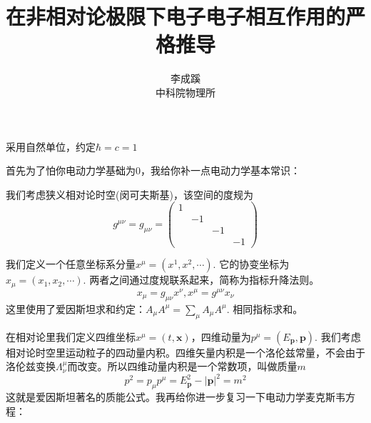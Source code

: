 \documentclass[a4paper]{article}
\begin{document}
    \title{在非相对论极限下电子电子相互作用的严格推导}
    \author{李成蹊\\中科院物理所}
    \date{}
    \maketitle

    采用自然单位，约定$\hbar=c=1$

    首先为了怕你电动力学基础为$0$，我给你补一点电动力学基本常识：

    我们考虑狭义相对论时空(闵可夫斯基)，该空间的度规为
    \begin{equation}
        g^{\mu\nu}=g_{\mu\nu}=\begin{pmatrix}
            1\\
            &-1\\
            &&-1\\
            &&&-1
        \end{pmatrix}
    \end{equation}
    
    我们定义一个任意坐标系分量$x^\mu=(x^1,x^2,\cdots)$. 它的协变坐标为$x_\mu=(x_1,x_2,\cdots)$. 两者之间通过度规联系起来，简称为指标升降法则。
    \begin{equation}
        x_{\mu}=g_{\mu\nu}x^{\nu},x^{\mu}=g^{\mu\nu}x_{\nu}
    \end{equation}
    这里使用了爱因斯坦求和约定：$A_\mu A^\mu=\sum_{\mu}A_\mu A^\mu$. 相同指标求和。
    
    在相对论里我们定义四维坐标$x^\mu=(t,\mathbf{x})$，四维动量为$p^\mu=(E_\mathbf{p},\mathbf{p})$. 我们考虑相对论时空里运动粒子的四动量内积。四维矢量内积是一个洛伦兹常量，不会由于洛伦兹变换$\Lambda^\mu_\nu$而改变。所以四维动量内积是一个常数项，叫做质量$m$
    \begin{equation}
        p^2=p_\mu p^\mu=E_\mathbf{p}^2-|\mathbf{p}|^2=m^2
    \end{equation}
    这就是爱因斯坦著名的质能公式。我再给你进一步复习一下电动力学麦克斯韦方程：
\end{document}
